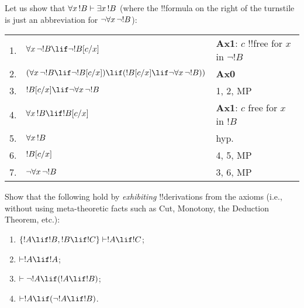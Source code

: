 \documentclass[../../include/open-logic-section]{subfiles}
\begin{document}


Let us show that $\lforall[x][!B] \Proves \lexists[x][!B]$
(where the !!{formula} on the right of the turnstile is just an
abbreviation for $\lnot \lforall[x][\lnot !B]$):

\begin{tabular}{rll}
 1. & $\lforall[x][\lnot !B] \lif \lnot \Subst{!B}{c}{x}$ &
 \textbf{Ax1}: $c$ !!{free for} $x$ in $\lnot !B$ \\
 2. &  $(\lforall[x][\lnot !B] \lif \lnot \Subst{!B}{c}{x}) \lif
 (\Subst{!B}{c}{x} \lif \lnot\lforall[x][\lnot !B]))$ & \textbf{Ax0}\\
 3. & $\Subst{!B}{c}{x} \lif \lnot\lforall[x][\lnot !B]$ & 1, 2, MP\\
 4. & $\lforall[x][!B] \lif \Subst{!B}{c}{x}$ & \textbf{Ax1}: $c$ free
 for $x$ in $!B$ \\
 5. & $\lforall[x][!B]$ & hyp. \\
 6. & $!B[c/x]$ & 4, 5, MP \\
 7. & $\lnot \lforall[x][\lnot !B]$ & 3, 6, MP
\end{tabular}

\begin{prob} 
Show that the following hold by \emph{exhibiting}
!!{derivation}s from the axioms (i.e., without using meta-theoretic facts
such as Cut, Monotony, the Deduction Theorem, etc.): 
\begin{enumerate} 
\item $\{!A\lif !B, !B\lif !C\} \Proves !A\lif !C$;
\item $\Proves !A \lif !A$;
\item $\Proves \lnot !A \lif (!A \lif !B)$;
\item $\Proves !A \lif (\lnot !A \lif !B)$.
\end{enumerate} 
\end{prob}
\end{document}
